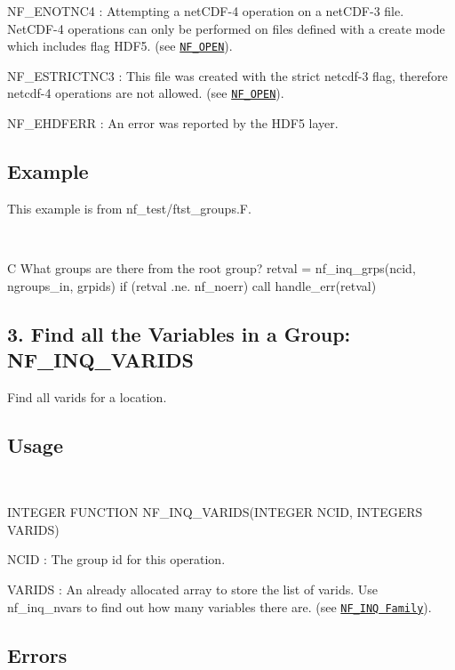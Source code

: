 {\ttfamily N\+F\+\_\+\+E\+N\+O\+T\+N\+C4} \+: Attempting a net\+C\+D\+F-\/4 operation on a net\+C\+D\+F-\/3 file. Net\+C\+D\+F-\/4 operations can only be performed on files defined with a create mode which includes flag H\+D\+F5. (see \href{#NF_005fOPEN}{\tt N\+F\+\_\+\+O\+P\+EN}).

{\ttfamily N\+F\+\_\+\+E\+S\+T\+R\+I\+C\+T\+N\+C3} \+: This file was created with the strict netcdf-\/3 flag, therefore netcdf-\/4 operations are not allowed. (see \href{#NF_005fOPEN}{\tt N\+F\+\_\+\+O\+P\+EN}).

{\ttfamily N\+F\+\_\+\+E\+H\+D\+F\+E\+RR} \+: An error was reported by the H\+D\+F5 layer.

\subsection*{Example }

This example is from nf\+\_\+test/ftst\+\_\+groups.\+F.

 

C What groups are there from the root group? retval = nf\+\_\+inq\+\_\+grps(ncid, ngroups\+\_\+in, grpids) if (retval .ne. nf\+\_\+noerr) call handle\+\_\+err(retval)\hypertarget{nc_f77_interface_guide_f77_NF-INQ-VARIDS}{}\subsection{3. Find all the Variables in a Group\+: N\+F\+\_\+\+I\+N\+Q\+\_\+\+V\+A\+R\+I\+D\+S }\label{nc_f77_interface_guide_f77_NF-INQ-VARIDS}
Find all varids for a location.

\subsection*{Usage }

 

I\+N\+T\+E\+G\+ER F\+U\+N\+C\+T\+I\+ON N\+F\+\_\+\+I\+N\+Q\+\_\+\+V\+A\+R\+I\+D\+S(\+I\+N\+T\+E\+G\+E\+R N\+C\+I\+D, I\+N\+T\+E\+G\+E\+R\+S V\+A\+R\+I\+D\+S)

{\ttfamily N\+C\+ID} \+: The group id for this operation.

{\ttfamily V\+A\+R\+I\+DS} \+: An already allocated array to store the list of varids. Use nf\+\_\+inq\+\_\+nvars to find out how many variables there are. (see \href{#NF_005fINQ-Family}{\tt N\+F\+\_\+\+I\+NQ Family}).

\subsection*{Errors }

